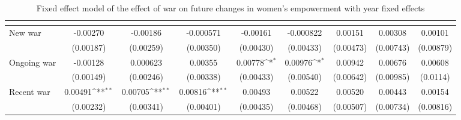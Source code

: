 \begin{table}[htbp]\centering
\def\sym#1{\ifmmode^{#1}\else\(^{#1}\)\fi}
\caption{Fixed effect model of the effect of war on future changes in women's empowerment with year fixed effects\label{polemprobustyear}}
\begin{tabular}{l*{8}{c}}
\hline\hline
                    &&&&&&&&\\
\hline
New war             &    -0.00270         &    -0.00186         &   -0.000571         &    -0.00161         &   -0.000822         &     0.00151         &     0.00308         &     0.00101         \\
                    &   (0.00187)         &   (0.00259)         &   (0.00350)         &   (0.00430)         &   (0.00433)         &   (0.00473)         &   (0.00743)         &   (0.00879)         \\
[1em]
Ongoing war         &    -0.00128         &    0.000623         &     0.00355         &     0.00778\sym{*}  &     0.00976\sym{*}  &     0.00942         &     0.00676         &     0.00608         \\
                    &   (0.00149)         &   (0.00246)         &   (0.00338)         &   (0.00433)         &   (0.00540)         &   (0.00642)         &   (0.00985)         &    (0.0114)         \\
[1em]
Recent war          &     0.00491\sym{**} &     0.00705\sym{**} &     0.00816\sym{**} &     0.00493         &     0.00522         &     0.00520         &     0.00443         &     0.00154         \\
                    &   (0.00232)         &   (0.00341)         &   (0.00401)         &   (0.00435)         &   (0.00468)         &   (0.00507)         &   (0.00734)         &   (0.00816)         \\
[1em]

\end{tabular}
\end{table}

